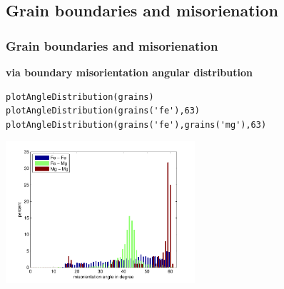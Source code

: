 \subsection{Grain boundaries and misorienation}
\begin{frame}[fragile]
  \frametitle{Grain boundaries and misorienation}



\begin{overprint}
\textbf{via boundary misorientation angular distribution} %
\begin{lstlisting}
plotAngleDistribution(grains)
plotAngleDistribution(grains('fe'),63)
plotAngleDistribution(grains('fe'),grains('mg'),63)
\end{lstlisting}
\begin{center}
\includegraphics[width=7cm]{fig/grains_angledistribution}
\par\end{center}



\end{overprint}
\end{frame}

